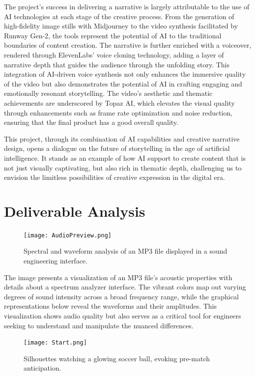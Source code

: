 \documentclass[11pt,a4paper,oneside]{report}
\begin{document}
The project's success in delivering a narrative is largely attributable to the use of AI technologies at each stage of the creative process. 
From the generation of high-fidelity image stills with Midjourney to the video synthesis facilitated by Runway Gen-2, the tools represent the potential of AI to the traditional boundaries of content creation. 
The narrative is further enriched with a voiceover, rendered through ElevenLabs' voice cloning technology, adding a layer of narrative depth that guides the audience through the unfolding story. 
This integration of AI-driven voice synthesis not only enhances the immersive quality of the video but also demonstrates the potential of AI in crafting engaging and emotionally resonant storytelling. 
The video's aesthetic and thematic achievements are underscored by Topaz AI, which elevates the visual quality through enhancements such as frame rate optimization and noise reduction, ensuring that the final product has a good overall quality.

This project, through its combination of AI capabilities and creative narrative design, opens a dialogue on the future of storytelling in the age of artificial intelligence. 
It stands as an example of how AI support to create content that is not just visually captivating, but also rich in thematic depth, challenging us to envision the limitless possibilities of creative expression in the digital era.

\section{Deliverable Analysis}

\begin{figure}[htbp]
  \centering
  \texttt{[image: AudioPreview.png]}
  \caption{Spectral and waveform analysis of an MP3 file displayed in a sound engineering interface.}
\end{figure}

The image presents a visualization of an MP3 file's acoustic properties with details about a spectrum analyzer interface. 
The vibrant colors map out varying degrees of sound intensity across a broad frequency range, while the graphical representations below reveal the waveforms and their amplitudes. 
This visualization shows audio quality but also serves as a critical tool for engineers seeking to understand and manipulate the nuanced differences.

\newpage

\begin{figure}[htbp]
  \centering
  \texttt{[image: Start.png]}
  \caption{Silhouettes watching a glowing soccer ball, evoking pre-match anticipation.}
\end{figure}
\end{document}
